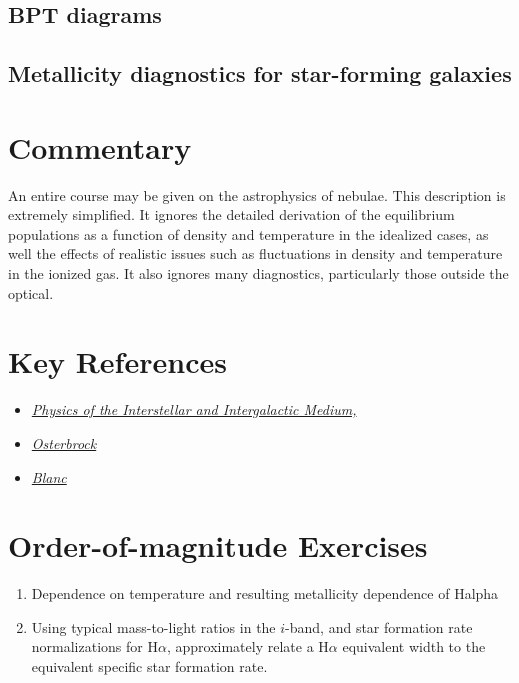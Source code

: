 \subsection{BPT diagrams}

\subsection{Metallicity diagnostics for star-forming galaxies}

\section{Commentary}

An entire course may be given on the astrophysics of nebulae. This
description is extremely simplified. It ignores the detailed
derivation of the equilibrium populations as a function of density and
temperature in the idealized cases, as well the effects of realistic
issues such as fluctuations in density and temperature in the ionized
gas. It also ignores many diagnostics, particularly those outside the
optical.

\section{Key References}

\begin{itemize}
  \item
    \href{http://}
    {\it Physics of the Interstellar and Intergalactic Medium,
      \citet{draine07a}}
  \item
    \href{http://}
    {\it Osterbrock
      \citet{osterbrock06a}}
  \item
    \href{http://}
    {\it Blanc
      \citet{blanc15a}}
\end{itemize}

\section{Order-of-magnitude Exercises}

\begin{enumerate} 
\item Dependence on temperature and resulting metallicity dependence
  of Halpha 
\item Using typical mass-to-light ratios in the $i$-band, and star
formation rate normalizations for H$\alpha$, approximately relate a
H$\alpha$ equivalent width to the equivalent specific star formation
rate.
\end{enumerate}   

